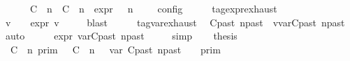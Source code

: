 \begin{isabellebody}
\ \ \ \ {\isasymunion}\ {\isasymlbrakk}\ {\isacharparenleft}{\isacharparenleft}C\ {\isasymUp}\ n{\isacharparenright}\ {\isacharhash}\ {\isacharparenleft}C\ {\isasymDown}\ n\ {\isacharat}{\isasymsharp}\ {\isasymtau}\isactrlsub e\isactrlsub x\isactrlsub p\isactrlsub r{\isacharparenright}\ {\isacharhash}\ {\isasymGamma}{\isacharparenright}{\isacharcomma}\ n\ {\isasymturnstile}\ {\isasymPsi}\ {\isasymtriangleright}\ {\isasymPhi}\ {\isasymrbrakk}\isactrlsub c\isactrlsub o\isactrlsub n\isactrlsub f\isactrlsub i\isactrlsub g{\isacartoucheclose}\isanewline
%
\isadelimproof
%
\endisadelimproof
%
\isatagproof
{}\isamarkupfalse%
\ {\isacharminus}\isanewline
\ \ \isamarkupfalse%
\ tag{\isacharunderscore}expr{\isachardot}exhaust\ \isamarkupfalse%
\ v\ {\isasymdelta}{\isasymtau}\ \ {\isacartoucheopen}\ {\isasymtau}\isactrlsub e\isactrlsub x\isactrlsub p\isactrlsub r{\isacharequal}{\isasymlparr}\ v\ {\isasymoplus}\ {\isasymdelta}{\isasymtau}\ {\isasymrparr}{\isacartoucheclose}\ \isamarkupfalse%
\ blast\isanewline
\ \ \isamarkupfalse%
\ \isamarkupfalse%
\ tag{\isacharunderscore}var{\isachardot}exhaust\ \isamarkupfalse%
\ C\isactrlsub p\isactrlsub a\isactrlsub s\isactrlsub t\ n\isactrlsub p\isactrlsub a\isactrlsub s\isactrlsub t\ \ {\isacartoucheopen}v{\isacharequal}{\isasymtau}\isactrlsub v\isactrlsub a\isactrlsub r{\isacharparenleft}C\isactrlsub p\isactrlsub a\isactrlsub s\isactrlsub t{\isacharcomma}\ n\isactrlsub p\isactrlsub a\isactrlsub s\isactrlsub t{\isacharparenright}{\isacartoucheclose}\ \isamarkupfalse%
\ auto\isanewline
\ \ \isamarkupfalse%
\ \isamarkupfalse%
\ {\isacharasterisk}{\isacharcolon}{\isacartoucheopen}{\isasymtau}\isactrlsub e\isactrlsub x\isactrlsub p\isactrlsub r{\isacharequal}{\isasymlparr}\ {\isasymtau}\isactrlsub v\isactrlsub a\isactrlsub r{\isacharparenleft}C\isactrlsub p\isactrlsub a\isactrlsub s\isactrlsub t{\isacharcomma}\ n\isactrlsub p\isactrlsub a\isactrlsub s\isactrlsub t{\isacharparenright}\ {\isasymoplus}\ {\isasymdelta}{\isasymtau}\ {\isasymrparr}{\isacartoucheclose}\ \isamarkupfalse%
\ simp\isanewline
\ \ \isamarkupfalse%
\ {\isacharquery}thesis\isanewline
\ \ \isamarkupfalse%
\ {\isacharminus}\isanewline
\ \ \ \ \isamarkupfalse%
\ {\isacartoucheopen}{\isacharparenleft}{\isasymlbrakk}\ C\ {\isasymUp}\ n\ {\isasymrbrakk}\isactrlsub p\isactrlsub r\isactrlsub i\isactrlsub m\ {\isasyminter}\ {\isasymlbrakk}\ C\ {\isasymDown}\ n\ {\isacharat}{\isasymsharp}\ {\isasymlparr}\ {\isasymtau}\isactrlsub v\isactrlsub a\isactrlsub r\ {\isacharparenleft}C\isactrlsub p\isactrlsub a\isactrlsub s\isactrlsub t{\isacharcomma}\ n\isactrlsub p\isactrlsub a\isactrlsub s\isactrlsub t{\isacharparenright}\ {\isasymoplus}\ {\isasymdelta}{\isasymtau}\ {\isasymrparr}\ {\isasymrbrakk}\isactrlsub p\isactrlsub r\isactrlsub i\isactrlsub m\isanewline

\end{isabellebody}
